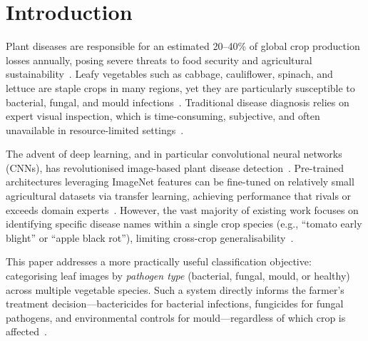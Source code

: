 \documentclass[conference]{IEEEtran}
\begin{document}
%
\graphicspath{{results/}}

\section{Introduction}

Plant diseases are responsible for an estimated 20--40\% of global crop production losses annually, posing severe threats to food security and agricultural sustainability~\cite{savary2019global}. Leafy vegetables such as cabbage, cauliflower, spinach, and lettuce are staple crops in many regions, yet they are particularly susceptible to bacterial, fungal, and mould infections~\cite{strange2005plant}. Traditional disease diagnosis relies on expert visual inspection, which is time-consuming, subjective, and often unavailable in resource-limited settings~\cite{mahlein2016plant}.

The advent of deep learning, and in particular convolutional neural networks (CNNs), has revolutionised image-based plant disease detection~\cite{mohanty2016using,ferentinos2018deep}. Pre-trained architectures leveraging ImageNet features can be fine-tuned on relatively small agricultural datasets via transfer learning, achieving performance that rivals or exceeds domain experts~\cite{yosinski2014transferable}. However, the vast majority of existing work focuses on identifying specific disease names within a single crop species (e.g., ``tomato early blight'' or ``apple black rot''), limiting cross-crop generalisability~\cite{barbedo2019plant}.

This paper addresses a more practically useful classification objective: categorising leaf images by \textit{pathogen type} (bacterial, fungal, mould, or healthy) across multiple vegetable species. Such a system directly informs the farmer's treatment decision---bactericides for bacterial infections, fungicides for fungal pathogens, and environmental controls for mould---regardless of which crop is affected~\cite{barbedo2018factors}.
\end{document}
